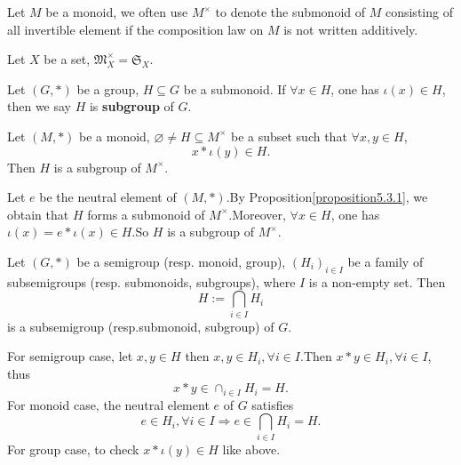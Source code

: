 \begin{notationenv}
    Let $M$ be a monoid,  we often use $M^\times$ to denote the submonoid of $M$ consisting of all invertible element if the composition law on $M$ is not written additively.
\end{notationenv}
\begin{exampleenv}
    Let $X$ be a set,  $\mathfrak{M} _X^\times=\mathfrak{S} _X$.
\end{exampleenv}
\begin{definitionenv}
    Let $(G, *)$ be a group,  $H\subseteq G$ be a submonoid. If $\forall x\in H$,  one has $\iota(x)\in H$,  then we say $H$ is \textbf{subgroup} of $G$.
\end{definitionenv}
\begin{propositionenv}
    Let $(M, *)$ be a monoid,  $\varnothing \not=H\subseteq M^\times$ be a subset such that $\forall x, y \in H$, 
    $$x*\iota(y)\in H.$$
    Then $H$ is a subgroup of $M^\times$.
\end{propositionenv}
\begin{proofenv}
    Let $e$ be the neutral element of $(M, *)$.By Proposition\ref{proposition5.3.1},  we obtain that $H$ forms a submonoid of $M^\times$.Moreover,  $\forall x \in H$,  one has $\iota(x)=e*\iota(x)\in H$.So $H$ is a subgroup of $M^\times$.
\end{proofenv}
\begin{propositionenv}
    Let $(G, *)$ be a semigroup (resp. monoid, group),  $(H_i)_{i\in I}$ be a family of subsemigroups (resp. submonoids, subgroups), where $I$ is a non-empty set. Then 
    $$H:=\bigcap_{i\in I}H_i$$
    is a subsemigroup (resp.submonoid, subgroup) of $G$.
\end{propositionenv}
\begin{proofenv}
    \quad\newline
    For semigroup case, let $x, y\in H$ then $x, y\in H_i, \forall i \in I$.Then $x*y\in H_i, \forall i \in I $,  thus 
    $$x*y\in \cap_{i\in I}H_i=H.$$
    For monoid case, the neutral element $e$ of $G$ satisfies
    $$e \in H_i, \forall i \in I\Rightarrow e\in \bigcap_{i\in I}H_i=H.$$
    For group case, to check $x*\iota(y)\in H$ like above.
\end{proofenv}

